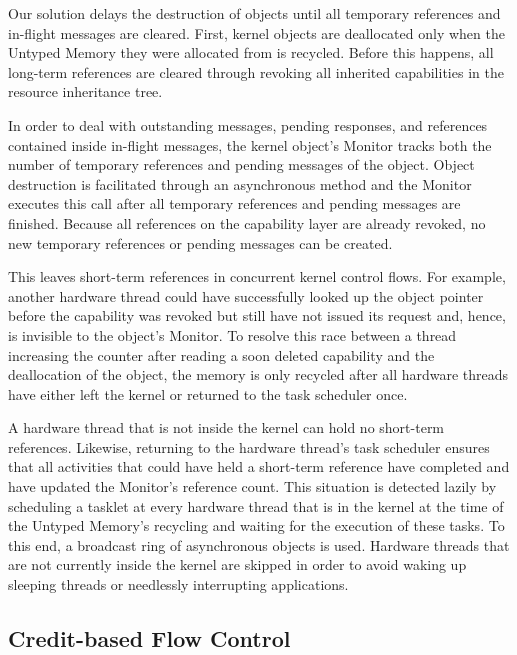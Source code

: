 Our solution delays the destruction of objects until all temporary references and in-flight messages are cleared. First, kernel objects are deallocated only when the Untyped Memory they were allocated from is recycled. Before this happens, all long-term references are cleared through revoking all inherited capabilities in the resource inheritance tree.

In order to deal with outstanding messages, pending responses, and references contained inside in-flight messages, the kernel object's Monitor
tracks both the number of temporary references and pending messages of the object. Object destruction is facilitated through an asynchronous method and the Monitor executes this call after all temporary references and pending messages are finished. Because all references on the capability layer are already revoked, no new temporary references or pending messages can be created.

This leaves short-term references in concurrent kernel control flows. For example, another hardware thread could have successfully looked up the object pointer before the capability was revoked but still have not issued its request and, hence, is invisible to the object's Monitor. To resolve this race between a thread increasing the counter after reading a soon deleted capability and the deallocation of the object, the memory is only recycled after all hardware threads have either left the kernel or returned to the task scheduler once.

A hardware thread that is not inside the kernel can hold no short-term references. Likewise, returning to the hardware thread's task scheduler ensures that all activities that could have held a short-term reference have completed and have updated the Monitor's reference count. This situation is detected lazily by scheduling a tasklet at every hardware thread that is in the kernel at the time of the Untyped Memory's recycling and waiting for the execution of these tasks. To this end, a broadcast ring of asynchronous objects is used. Hardware threads that are not currently inside the kernel are skipped in order to avoid waking up sleeping threads or needlessly interrupting applications.

\subsection{Credit-based Flow Control}
\label{sec:credit-flow-dyn}

